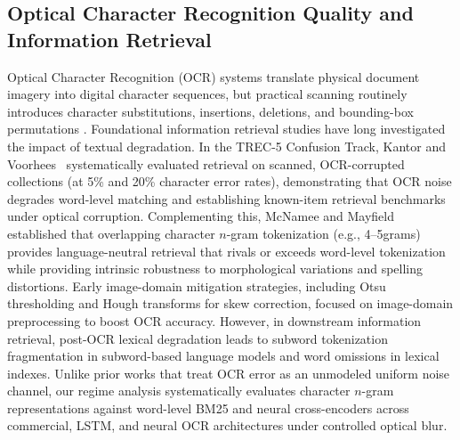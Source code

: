 \documentclass[conference]{IEEEtran}
\begin{document}
\subsection{Optical Character Recognition Quality and Information Retrieval}
Optical Character Recognition (OCR) systems translate physical document imagery into digital character sequences, but practical scanning routinely introduces character substitutions, insertions, deletions, and bounding-box permutations \cite{smith2007tesseract, fateh2024ocr}. Foundational information retrieval studies have long investigated the impact of textual degradation. In the TREC-5 Confusion Track, Kantor and Voorhees~\cite{kantor2000confusion} systematically evaluated retrieval on scanned, OCR-corrupted collections (at 5\% and 20\% character error rates), demonstrating that OCR noise degrades word-level matching and establishing known-item retrieval benchmarks under optical corruption. Complementing this, McNamee and Mayfield~\cite{mcnamee2004character} established that overlapping character $n$-gram tokenization (e.g., 4--5grams) provides language-neutral retrieval that rivals or exceeds word-level tokenization while providing intrinsic robustness to morphological variations and spelling distortions. Early image-domain mitigation strategies, including Otsu thresholding \cite{otsu1979} and Hough transforms \cite{hough1962} for skew correction, focused on image-domain preprocessing to boost OCR accuracy. However, in downstream information retrieval, post-OCR lexical degradation leads to subword tokenization fragmentation in subword-based language models and word omissions in lexical indexes. Unlike prior works that treat OCR error as an unmodeled uniform noise channel, our regime analysis systematically evaluates character $n$-gram representations against word-level BM25 and neural cross-encoders across commercial, LSTM, and neural OCR architectures under controlled optical blur.
\end{document}
